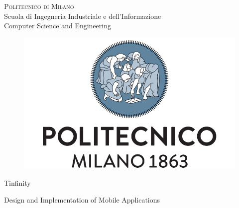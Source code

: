 \documentclass[15pt,a4paper,oneside]{article}
\begin{document}
\thispagestyle{empty}
\enlargethispage{60mm}
\begin{center}
\Large{\textsc{Politecnico di Milano}}\\
\large{Scuola di Ingegneria Industriale e dell'Informazione}\\
\large{Computer Science and Engineering}\\
\vspace{7mm}
\begin{figure}[h]
\begin{center}
\includegraphics[scale=0.30]{./images/polimi-logo}
\end{center}
\end{figure}
\vspace{2mm}

\begin{huge}
\begin{center}
Tinfinity
\end{center}
\end{huge}
\vspace{25mm}

\begin{LARGE}
\begin{center}
Design and Implementation of Mobile Applications
\end{center}
\vspace{2mm}
\end{LARGE}
\vspace{20mm}


\begin{flushleft}
\begin{tabular}{l l }

\end{tabular}
\end{flushleft}
\vspace{5mm}


\end{center}
\end{document}
